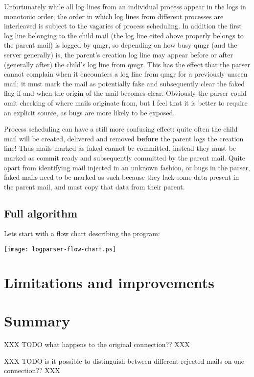 \documentclass[a4paper,12pt,draft]{article}
\begin{document}
\begin{enumerate}
        Unfortunately while all log lines from an individual process appear
        in the logs in monotonic order, the order in which log lines from
        different processes are interleaved is subject to the vagaries of
        process scheduling.  In addition the first log line belonging to
        the child mail (the log line cited above properly belongs to the
        parent mail) is logged by qmgr, so depending on how busy qmgr (and
        the server generally) is, the parent's creation log line may appear
        before or after (generally after) the child's log line from qmgr.
        This has the effect that the parser cannot complain when it
        encounters a log line from qmgr for a previously unseen mail; it
        must mark the mail as potentially fake and subsequently clear the
        faked flag if and when the origin of the mail becomes clear.
        Obviously the parser could omit checking of where mails originate
        from, but I feel that it is better to require an explicit source,
        as bugs are more likely to be exposed.

        Process scheduling can have a still more confusing effect: quite
        often the child mail will be created, delivered and removed
        \textbf{before} the parent logs the creation line!  Thus mails
        marked as faked cannot be committed, instead they must be marked as
        commit ready and subsequently committed by the parent mail.  Quite
        apart from identifying mail injected in an unknown fashion, or bugs
        in the parser, faked mails need to be marked as such because they
        lack some data present in the parent mail, and must copy that data
        from their parent.


\end{enumerate}

\subsection{Full algorithm}

Lets start with a flow chart describing the program:

\texttt{[image: logparser-flow-chart.ps]}


\section{Limitations and improvements}

\section{Summary}

XXX TODO what happens to the original connection?? XXX

XXX TODO is it possible to distinguish between different rejected mails on
one connection??  XXX

\appendix
\end{document}
